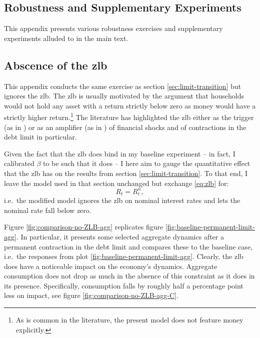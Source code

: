 \documentclass[a4paper,12pt]{article} %
\numberwithin{equation}{section} %
\numberwithin{figure}{section}
\numberwithin{table}{section}
\begin{document}
\begin{refsection}
\begin{appendices}
\section{Robustness and Supplementary Experiments}
\label{sec-app:robust}

This appendix presents various robustness exercises and supplementary experiments alluded to in the main text.

\subsection{Abscence of the \Gls{zlb}}
\label{sec-app:robust-no-zlb}

This appendix conducts the same exercise as section \ref{sec:limit-transition} but ignores the \Gls{zlb}. The \Gls{zlb} is usually motivated by the argument that households would not hold any asset with a return strictly below zero as money would have a strictly higher return.\footnote{As is common in the literature, the present model does not feature money explicitly.} The literature has highlighted the \Gls{zlb} either as the trigger (as in \cite{egg2012}) or as an amplifier (as in \cite{gl2017}) of financial shocks and of contractions in the debt limit in particular.

Given the fact that the \Gls{zlb} does bind in my baseline experiment -- in fact, I calibrated $\beta$ to be such that it does -- I here aim to gauge the quantitative effect that the \Gls{zlb} has on the results from section \ref{sec:limit-transition}. To that end, I leave the model used in that section unchanged but exchange \eqref{eq:zlb} for:
\begin{equation}
    R_t = R^n_t, \label{eq:no-zlb}
\end{equation}
i.e.~the modified model ignores the \Gls{zlb} on nominal interest rates and lets the nominal rate fall below zero.

Figure \ref{fig:comparison-no-ZLB-agg} replicates figure \ref{fig:baseline-permanent-limit-agg}. In particular, it presents some selected aggregate dynamics after a permanent contraction in the debt limit and compares these to the baseline case, i.e.~the responses from plot \ref{fig:baseline-permanent-limit-agg}. Clearly, the \Gls{zlb} does have a noticeable impact on the economy's dynamics. Aggregate consumption does not drop as much in the absence of this constraint as it does in its presence. Specifically, consumption falls by roughly half a percentage point less on impact, see figure \ref{fig:comparison-no-ZLB-agg-C}.


\end{appendices}
\end{refsection}
\end{document}
